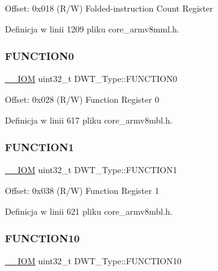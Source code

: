 Offset\+: 0x018 (R/W) Folded-\/instruction Count Register 

Definicja w linii 1209 pliku core\+\_\+armv8mml.\+h.

\mbox{\label{struct_d_w_t___type_a579ae082f58a0317b7ef029b20f52889}} 
\subsubsection{\texorpdfstring{F\+U\+N\+C\+T\+I\+O\+N0}{FUNCTION0}}
{\footnotesize\ttfamily \hyperlink{core__sc300_8h_ab6caba5853a60a17e8e04499b52bf691}{\+\_\+\+\_\+\+I\+OM} uint32\+\_\+t D\+W\+T\+\_\+\+Type\+::\+F\+U\+N\+C\+T\+I\+O\+N0}

Offset\+: 0x028 (R/W) Function Register 0 

Definicja w linii 617 pliku core\+\_\+armv8mbl.\+h.

\mbox{\label{struct_d_w_t___type_a8dfcf25675f9606aa305c46e85182e4e}} 
\subsubsection{\texorpdfstring{F\+U\+N\+C\+T\+I\+O\+N1}{FUNCTION1}}
{\footnotesize\ttfamily \hyperlink{core__sc300_8h_ab6caba5853a60a17e8e04499b52bf691}{\+\_\+\+\_\+\+I\+OM} uint32\+\_\+t D\+W\+T\+\_\+\+Type\+::\+F\+U\+N\+C\+T\+I\+O\+N1}

Offset\+: 0x038 (R/W) Function Register 1 

Definicja w linii 621 pliku core\+\_\+armv8mbl.\+h.

\mbox{\label{struct_d_w_t___type_a63c72c28fd46b22230894366a8d9cdda}} 
\subsubsection{\texorpdfstring{F\+U\+N\+C\+T\+I\+O\+N10}{FUNCTION10}}
{\footnotesize\ttfamily \hyperlink{core__sc300_8h_ab6caba5853a60a17e8e04499b52bf691}{\+\_\+\+\_\+\+I\+OM} uint32\+\_\+t D\+W\+T\+\_\+\+Type\+::\+F\+U\+N\+C\+T\+I\+O\+N10}

